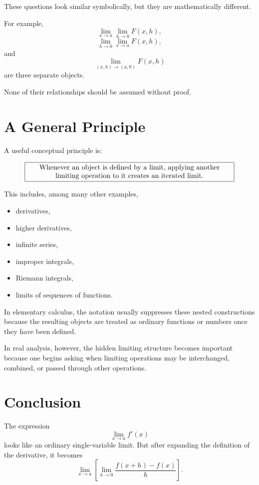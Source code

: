 \documentclass{essay}
\begin{document}
These questions look similar symbolically, but they are mathematically different.

For example,
\[
\lim_{x\to a}\lim_{h\to0}F(x,h),
\]
\[
\lim_{h\to0}\lim_{x\to a}F(x,h),
\]
and
\[
\lim_{(x,h)\to(a,0)}F(x,h)
\]
are three separate objects.

None of their relationships should be assumed without proof.

\section{A General Principle}

A useful conceptual principle is:

\[
\boxed{
\begin{minipage}{0.85\linewidth}
\centering
Whenever an object is defined by a limit, applying another limiting operation to it creates an iterated limit.
\end{minipage}
}
\]

This includes, among many other examples,

\begin{itemize}
    \item derivatives,
    \item higher derivatives,
    \item infinite series,
    \item improper integrals,
    \item Riemann integrals,
    \item limits of sequences of functions.
\end{itemize}

In elementary calculus, the notation usually suppresses these nested constructions because the resulting objects are treated as ordinary functions or numbers once they have been defined.

In real analysis, however, the hidden limiting structure becomes important because one begins asking when limiting operations may be interchanged, combined, or passed through other operations.

\section{Conclusion}

The expression
\[
\lim_{x\to a}f'(x)
\]
looks like an ordinary single-variable limit. But after expanding the definition of the derivative, it becomes
\[
\lim_{x\to a}
\left[
\lim_{h\to0}
\frac{f(x+h)-f(x)}{h}
\right].
\]
\end{document}
